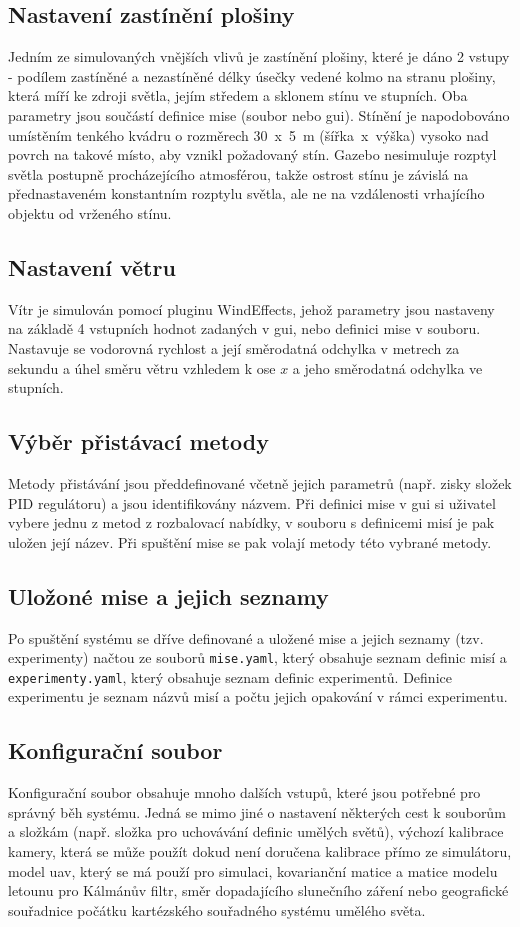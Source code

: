     \subsection{Nastavení zastínění plošiny}
      Jedním ze simulovaných vnějších vlivů je zastínění plošiny, které je dáno 2 vstupy - podílem zastíněné a nezastíněné délky úsečky vedené kolmo na stranu plošiny, která míří ke zdroji světla, jejím středem a sklonem stínu ve stupních. Oba parametry jsou součástí definice mise (soubor nebo \acrshort{gui}). Stínění je napodobováno umístěním tenkého kvádru o rozměrech 30~x~5~m (šířka~x~výška) vysoko nad povrch na takové místo, aby vznikl požadovaný stín. Gazebo nesimuluje rozptyl světla postupně procházejícího atmosférou, takže ostrost stínu je závislá na přednastaveném konstantním rozptylu světla, ale ne na vzdálenosti vrhajícího objektu od vrženého stínu.
    \subsection{Nastavení větru}
      Vítr je simulován pomocí pluginu WindEffects, jehož parametry jsou nastaveny na základě 4 vstupních hodnot zadaných v \acrshort{gui}, nebo definici mise v souboru. Nastavuje se vodorovná rychlost a její směrodatná odchylka v metrech za sekundu a úhel směru větru vzhledem k ose $x$ a jeho směrodatná odchylka ve stupních.
    \subsection{Výběr přistávací metody}
      Metody přistávání jsou předdefinované včetně jejich parametrů (např. zisky složek PID regulátoru) a jsou identifikovány názvem. Při definici mise v \acrshort{gui} si uživatel vybere jednu z metod z rozbalovací nabídky, v souboru s definicemi misí je pak uložen její název. Při spuštění mise se pak volají metody této vybrané metody.
    \subsection{Uložoné mise a jejich seznamy} \label{sec:saved}
      Po spuštění systému se dříve definované a uložené mise a jejich seznamy (tzv. experimenty) načtou ze souborů \texttt{mise.yaml}, který obsahuje seznam definic misí a \texttt{experimenty.yaml}, který obsahuje seznam definic experimentů. Definice experimentu je seznam názvů misí a počtu jejich opakování v rámci experimentu.
    \subsection{Konfigurační soubor}
      Konfigurační soubor obsahuje mnoho dalších vstupů, které jsou potřebné pro správný běh systému. Jedná se mimo jiné o nastavení některých cest k souborům a složkám (např. složka pro uchovávání definic umělých světů), výchozí kalibrace kamery, která se může použít dokud není doručena kalibrace přímo ze simulátoru, model \acrshort{uav}, který se má použí pro simulaci, kovarianční matice a matice modelu letounu pro Kálmánův filtr, směr dopadajícího slunečního záření nebo geografické souřadnice počátku kartézského souřadného systému umělého světa.
